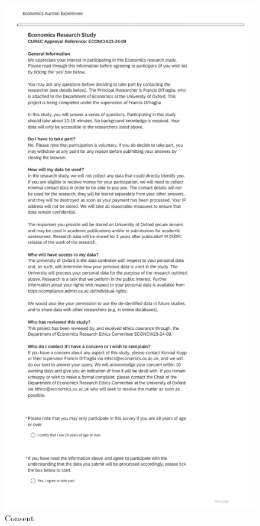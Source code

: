\documentclass[
]{report}
\begin{document}
\begin{figure}[H]

{\centering \includegraphics{experiment_instructions/consent.png}

}

\caption{Consent}

\end{figure}%
\end{document}
